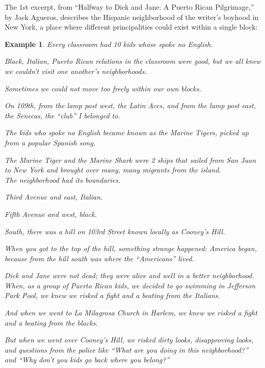 \documentclass{book}
\numberwithin{equation}{section}
\newtheorem{example}{Example}[chapter]
\begin{document}
The 1st excerpt, from ``Halfway to Dick and Jane: A Puerto Rican Pilgrimage,'' by Jack Agueros, describes the Hispanic neighborhood of the writer's boyhood in New York, a place where different principalities could exist within a single block:
\begin{example}
    Every classroom had 10 kids whose spoke no English.
    
    Black, Italian, Puerto Rican relations in the classroom were good, but we all knew we couldn't visit one another's neighborhoods.
    
    Sometimes we could not move too freely within our own blocks.
    
    On 109th, from the lamp post west, the Latin Aces, and from the lamp post east, the Senecas, the ``club'' I belonged to.
    
    The kids who spoke no English became known as the Marine Tigers, picked up from a popular Spanish song.
    
    The \textit{Marine Tiger} and the \textit{Marine Shark} were 2 ships that sailed from San Juan to New York and brought over many, many migrants from the island.
    \\
    
    The neighborhood had its boundaries.
    
    Third Avenue and east, Italian.
    
    Fifth Avenue and west, black.
    
    South, there was a hill on 103rd Street known locally as Cooney's Hill.
    
    When you got to the top of the hill, something strange happened: America began, because from the hill south was where the ``Americans'' lived.
    
    Dick and Jane were not dead; they were alive and well in a better neighborhood.
    \\
    
    When, as a group of Puerto Rican kids, we decided to go swimming in Jefferson Park Pool, we knew we risked a fight and a beating from the Italians.
    
    And when we went to La Milagrosa Church in Harlem, we knew we risked a fight and a beating from the blacks.
    
    But when we went over Cooney's Hill, we risked dirty looks, disapproving looks, and questions from the police like ``What are you doing in this neighborhood?'' and ``Why don't you kids go back where you belong?''
    \\
    

\end{example}
\end{document}
